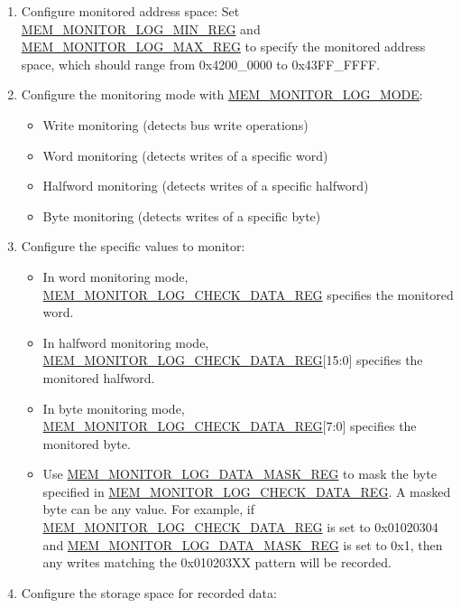 \documentclass[main\_\_EN.tex]{subfiles}
\begin{document}
\begin{enumerate}
    \item Configure monitored address space: Set \hyperref[regdesc:MEMMONITORLOGMINREG]{MEM\_MONITOR\_LOG\_MIN\_REG} and \hyperref[regdesc:MEMMONITORLOGMAXREG]{MEM\_MONITOR\_LOG\_MAX\_REG} to specify the monitored address space, which should range from 0x4200\_0000 to 0x43FF\_FFFF.
    \item Configure the monitoring mode with \hyperref[fielddesc:MEMMONITORLOGMODE]{MEM\_MONITOR\_LOG\_MODE}:
        \begin{itemize}
            \item Write monitoring (detects bus write operations)
            \item Word monitoring (detects writes of a specific word)
            \item Halfword monitoring (detects writes of a specific halfword)
            \item Byte monitoring (detects writes of a specific byte)
        \end{itemize}
    \item Configure the specific values to monitor:
        \begin{itemize}
            \item In word monitoring mode, \hyperref[regdesc:MEMMONITORLOGCHECKDATAREG]{MEM\_MONITOR\_LOG\_CHECK\_DATA\_REG} specifies the monitored word.
            \item In halfword monitoring mode, \hyperref[regdesc:MEMMONITORLOGCHECKDATAREG]{MEM\_MONITOR\_LOG\_CHECK\_DATA\_REG}[15:0] specifies the monitored halfword.
            \item In byte monitoring mode, \hyperref[regdesc:MEMMONITORLOGCHECKDATAREG]{MEM\_MONITOR\_LOG\_CHECK\_DATA\_REG}[7:0] specifies the monitored byte.
            \item Use \hyperref[regdesc:MEMMONITORLOGDATAMASKREG]{MEM\_MONITOR\_LOG\_DATA\_MASK\_REG} to mask the byte specified in \hyperref[regdesc:MEMMONITORLOGCHECKDATAREG]{MEM\_MONITOR\_LOG\_CHECK\_DATA\_REG}. A masked byte can be any value. For example, if \hyperref[regdesc:MEMMONITORLOGCHECKDATAREG]{MEM\_MONITOR\_LOG\_CHECK\_DATA\_REG} is set to 0x01020304 and \hyperref[regdesc:MEMMONITORLOGDATAMASKREG]{MEM\_MONITOR\_LOG\_DATA\_MASK\_REG} is set to 0x1, then any writes matching the 0x010203XX pattern will be recorded.
        \end{itemize}
    \item Configure the storage space for recorded data:
        \begin{itemize}

\end{itemize}
\end{enumerate}
\end{document}
